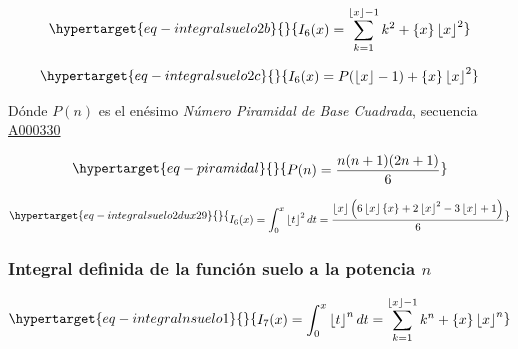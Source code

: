 \documentclass[
  letterpaper,
  DIV=11,
  numbers=noendperiod]{scrreprt}
\begin{document}
\begin{equation}\protect\hypertarget{eq-integralsuelo2b}{}{
\begin{multline}
I_{6}(x) =\sum_{k=1}^{\left\lfloor x \right\rfloor - 1}{k^2} +
\left\{ x \right\}\left\lfloor x \right\rfloor^2 
\end{multline}
}\label{eq-integralsuelo2b}\end{equation}

\begin{equation}\protect\hypertarget{eq-integralsuelo2c}{}{
\begin{multline}
I_{6}(x) = 
P(\left\lfloor x \right\rfloor - 1) + \left\{ x \right\} \left\lfloor x \right\rfloor^2
\end{multline}
}\label{eq-integralsuelo2c}\end{equation}

Dónde \(P(n)\) es el enésimo \emph{Número Piramidal de Base Cuadrada},
secuencia \href{https://oeis.org/A000330}{A000330}

\begin{equation}\protect\hypertarget{eq-piramidal}{}{
\begin{multline}
P(n) =\frac{n(n+1)(2n+1)}{6}
\end{multline}
}\label{eq-piramidal}\end{equation}

\begin{equation}\protect\hypertarget{eq-integralsuelo2dux29}{}{
\begin{multline}
I_{6}(x) = \int_{0}^{x}{\left\lfloor t \right\rfloor^2 dt} = 
\frac{\left\lfloor x \right\rfloor  \left(6 \left\lfloor x \right\rfloor \left\{ x \right\} +
2 \left\lfloor x \right\rfloor^{2} - 3 \left\lfloor x \right\rfloor + 1 \right)}{6}
\end{multline}
}\label{eq-integralsuelo2d)}\end{equation}

\hypertarget{integral-definida-de-la-funciuxf3n-suelo-a-la-potencia-n}{%
\subsubsection{\texorpdfstring{Integral definida de la función suelo a
la potencia
\(n\)}{Integral definida de la función suelo a la potencia n}}\label{integral-definida-de-la-funciuxf3n-suelo-a-la-potencia-n}}

\begin{equation}\protect\hypertarget{eq-integralnsuelo1}{}{
\begin{multline}
I_{7}(x)= \int_{0}^{x}{\left\lfloor t \right\rfloor^{n} dt } =
\sum_{k=1}^{\left\lfloor x \right\rfloor - 1}{k^n} + \left\{ x \right\}\left\lfloor x \right\rfloor^n
\end{multline}
}\label{eq-integralnsuelo1}\end{equation}
\end{document}
